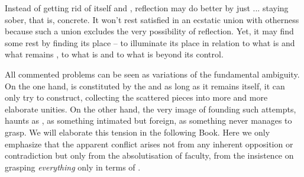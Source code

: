 {  Instead of getting rid of itself and , reflection may
  do better by just ... staying sober, that is, concrete.  It won't rest
  satisfied in an ecstatic union with otherness because such a union excludes
  the very possibility of reflection. Yet, it may find some rest by finding its
  place -- to illuminate its place in relation to what is  and what
  remains , to what is  and to what is beyond its
  control.  }


\label{sub:givens}

\pa All commented problems can be seen as variations of the fundamental
 ambiguity. On the one hand,  is constituted by
the  and as long as it remains itself, it can only try to
construct, collecting the scattered pieces into more and more elaborate unities.
On the other hand, the very image of  founding such attempts, haunts
 as , as something intimated but foreign, as
something  never manages to grasp. We will elaborate this
tension in the following Book. Here we only emphasize that the apparent conflict
arises not from any inherent opposition or contradiction but only from the
absolutisation of  faculty, from the insistence on grasping {\em
  everything} only in terms of . 

